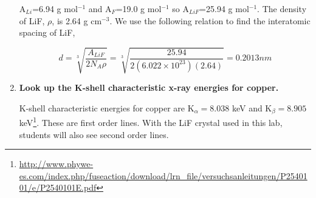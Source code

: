 \begin{enumerate}
A$_{Li}$=6.94 g mol$^{-1}$ and A$_{F}$=19.0 g mol$^{-1}$ so A$_{LiF}$=25.94 g mol$^{-1}$. The density of LiF, $\rho$, is 2.64 g cm$^{-3}$. We use the following relation to find the interatomic spacing of LiF,

\begin{equation}
d=\sqrt[3]{\dfrac{A_{LiF}}{2N_A\rho}}=\sqrt[3]{\dfrac{25.94}{2(6.022\times10^{23})(2.64)}}=0.2013nm
\label{equ:twcg2}
\end{equation}

\item {\bf Look up the K-shell characteristic x-ray energies for copper.}\newline

K-shell characteristic  energies for copper are K$_{\alpha}=8.038$ keV and K$_{\beta}=8.905$ keV\footnote{\url{http://www.phywe-es.com/index.php/fuseaction/download/lrn_file/versuchsanleitungen/P2540101/e/P2540101E.pdf}}. These are first order lines. With the LiF crystal used in this lab, students will also see second order lines.

\end{enumerate}


